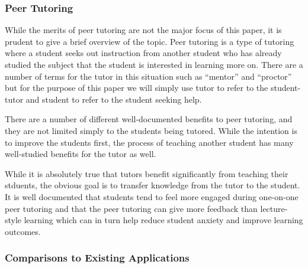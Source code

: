 \subsubsection{Peer Tutoring}
\label{peer-tutoring}
While the merits of peer tutoring are not the major focus of this paper, it is
prudent to give a brief overview of the topic.  Peer tutoring is a type of
tutoring where a student seeks out instruction from another student who has
already studied the subject that the student is interested in learning more on.
There are a number of terms for the tutor in this situation such as ``mentor''
and ``proctor'' but for the purpose of this paper we will simply use tutor to
refer to the student-tutor and student to refer to the student seeking help. \cite{kim}

There are a number of different well-documented benefits to peer tutoring, and
they are not limited simply to the students being tutored.  While the intention
is to improve the students first, the process of teaching another student has
many well-studied benefits for the tutor as well. \cite{kim}

While it is absolutely true that tutors benefit significantly from teaching
their stduents, the obvious goal is to transfer knowledge from the tutor to the
student. It is well documented that students tend to feel more engaged during
one-on-one peer tutoring and that the peer tutoring can give more feedback than
lecture-style learning which can in turn help reduce student anxiety and improve
learning outcomes. \cite{topping}

\subsubsection{Comparisons to Existing Applications}
\label{comparisons}


